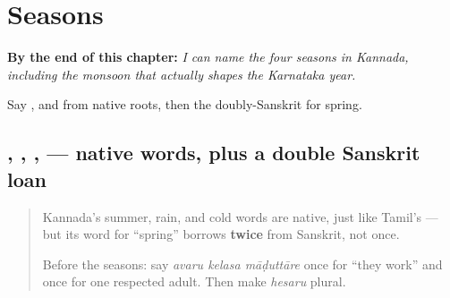 
\chapter{Seasons}
\label{ch:ka-seasons}

\begin{chapteropening}
\textbf{By the end of this chapter:} \emph{I can name the four seasons in Kannada, including the monsoon that actually shapes the Karnataka year.}

Say ,  and  from native roots, then the doubly-Sanskrit   for spring.
\end{chapteropening}

\section[\texorpdfstring{\kn{ವಸಂತ} \kn{ಋತು} \kn{ಬೇಸಿಗೆ} … (vasanta ṛtu …)}{ವಸಂತ ಋತು ಬೇಸಿಗೆ … (vasanta ṛtu …)}]{ , , ,  — native words, plus a double Sanskrit loan}

\label{lesson:KA-C14-kaalagalu}



\begin{quote}
Kannada's summer, rain, and cold words are native, just like Tamil's — but its word for \textquotedblleft{}spring\textquotedblright{} borrows \textbf{twice} from Sanskrit, not once.

Before the seasons: say \emph{avaru kelasa māḍuttāre} once for “they work” and once for one respected adult. Then make \emph{hesaru} plural.
\end{quote}

